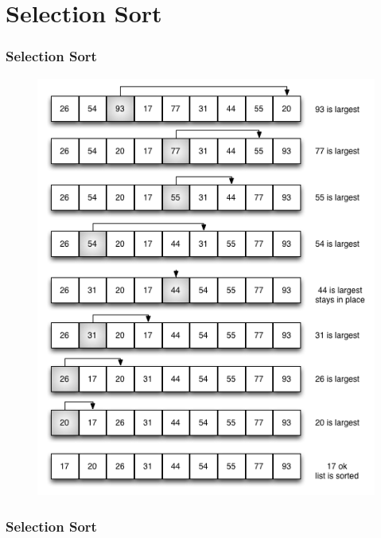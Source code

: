 \documentclass{beamer}
\begin{document}
\section{Selection Sort}
\begin{frame}
    \frametitle{Selection Sort}
    \begin{figure}[h]
        \includegraphics[scale=0.35]{selection/selection}
    \end{figure}
\end{frame}
\begin{frame}
    \frametitle{Selection Sort}
    \begin{algorithm}[H]
        
    \end{algorithm}
\end{frame}
\end{document}
